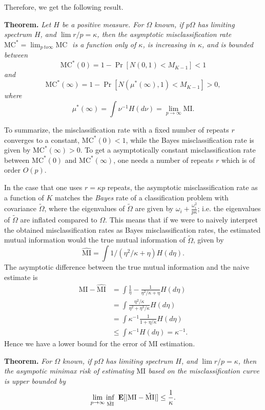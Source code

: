 \documentclass[12pt]{article}
\begin{document}
Therefore, we get the following result.

\textbf{Theorem. }\emph{
Let $H$ be a positive measure.
For $\Omega$ known, if $p\Omega$ has limiting spectrum $H$, and $\lim r/p = \kappa$, then
the asymptotic misclassification rate $\text{MC}^* = \lim_{p\ to \infty} \text{MC }$ is a function only of $\kappa$,
is increasing in $\kappa$,
and is bounded between
\[
\text{MC}^*(0) = 1 - \Pr[N(0, 1) < M_{K-1}] < 1
\]
and
\[
\text{MC}^*(\infty) = 1-\Pr[N(\mu^*(\infty), 1) < M_{K-1}] > 0,
\]
where
\[
\mu^*(\infty) = \int \nu^{-1} H(d\nu) = \lim_{p\to \infty} \text{MI}.
\]
}

To summarize, the misclassification rate with a fixed number of
repeats $r$ converges to a constant, $\text{MC}^*(0) < 1$, while the
Bayes misclassification rate is given by $\text{MC}^*(\infty) > 0$.
To get a asymptotically constant misclassification rate between
$\text{MC}^*(0)$ and $\text{MC}^*(\infty)$, one needs a number of
repeats $r$ which is of order $O(p)$.

In the case that one uses $r = \kappa p$ repeats, the asymptotic
misclassification rate as a function of $K$ matches the \emph{Bayes}
rate of a classification problem with covariance $\tilde{\Omega}$,
where the eigenvalues of $\tilde{\Omega}$ are given by $\omega_i
+ \frac{\omega_i^2}{p\kappa}$; i.e. the eigenvalues of
$\tilde{\Omega}$ are inflated compared to $\Omega$.  This means that
if we were to naively interpret the obtained misclassification rates
as Bayes misclassification rates, the estimated mutual information
would the true mutual information of $\tilde{\Omega}$, given by
\[
\hat{\text{MI}} = 
\int 1/(\eta^2/\kappa + \eta) H(d\eta).\]
The asymptotic difference between the true mutual information and the naive estimate is
\begin{align*}
\text{MI} - \hat{\text{MI}} &= \int \frac{1}{\eta} - \frac{1}{\eta^2/\kappa + \eta}H(d\eta) 
\\&= \int \frac{\eta^2/\kappa}{\eta^2 + \eta^3/\kappa} H(d\eta)
\\&= \int \kappa^{-1} \frac{1}{1 + \eta/\kappa} H(d\eta)
\\&\leq \int \kappa^{-1} H(d\eta) =  \kappa^{-1}.
\end{align*}
Hence we have a lower bound for the error of MI estimation.

\textbf{Theorem. }
\emph{
For $\Omega$ known, if $p\Omega$ has limiting spectrum $H$, and $\lim r/p = \kappa$, then
the asympotic minimax risk of estimating $\text{MI}$ based on the misclassification curve is upper bounded by}
\[
\lim_{p \to \infty} \inf_{\hat{\text{MI}}}\ \E[|\text{MI} - \hat{\text{MI}}|] \leq \frac{1}{\kappa}.
\]
\end{document}
